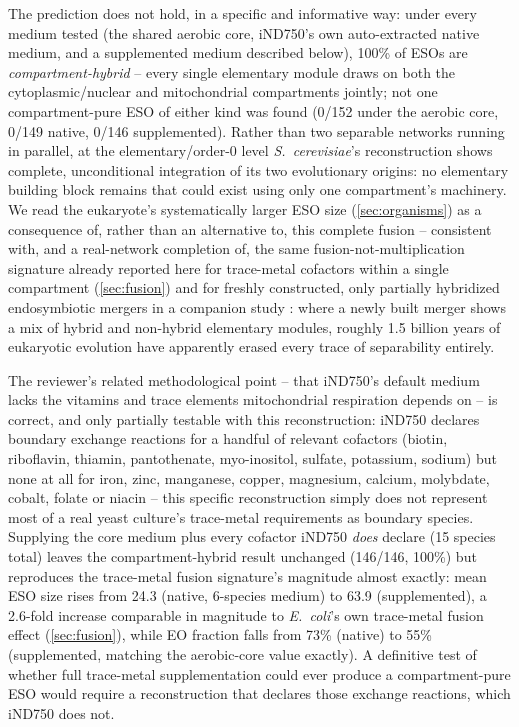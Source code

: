 \documentclass[nocrop]{bioinfo}
\begin{document}
The prediction does not hold, in a specific and informative way: under every medium tested (the shared aerobic core, iND750's own auto-extracted native medium, and a supplemented medium described below), 100\% of ESOs are \emph{compartment-hybrid} -- every single elementary module draws on both the cytoplasmic/nuclear and mitochondrial compartments jointly; not one compartment-pure ESO of either kind was found (0/152 under the aerobic core, 0/149 native, 0/146 supplemented). Rather than two separable networks running in parallel, at the elementary/order-0 level \textit{S.\ cerevisiae}'s reconstruction shows complete, unconditional integration of its two evolutionary origins: no elementary building block remains that could exist using only one compartment's machinery. We read the eukaryote's systematically larger ESO size (\cref{sec:organisms}) as a consequence of, rather than an alternative to, this complete fusion -- consistent with, and a real-network completion of, the same fusion-not-multiplication signature already reported here for trace-metal cofactors within a single compartment (\cref{sec:fusion}) and for freshly constructed, only partially hybridized endosymbiotic mergers in a companion study \citep{velozendosymbiosis2026}: where a newly built merger shows a mix of hybrid and non-hybrid elementary modules, roughly 1.5 billion years of eukaryotic evolution have apparently erased every trace of separability entirely.

The reviewer's related methodological point -- that iND750's default medium lacks the vitamins and trace elements mitochondrial respiration depends on -- is correct, and only partially testable with this reconstruction: iND750 declares boundary exchange reactions for a handful of relevant cofactors (biotin, riboflavin, thiamin, pantothenate, myo-inositol, sulfate, potassium, sodium) but none at all for iron, zinc, manganese, copper, magnesium, calcium, molybdate, cobalt, folate or niacin -- this specific reconstruction simply does not represent most of a real yeast culture's trace-metal requirements as boundary species. Supplying the core medium plus every cofactor iND750 \emph{does} declare (15 species total) leaves the compartment-hybrid result unchanged (146/146, 100\%) but reproduces the trace-metal fusion signature's magnitude almost exactly: mean ESO size rises from 24.3 (native, 6-species medium) to 63.9 (supplemented), a 2.6-fold increase comparable in magnitude to \textit{E.\ coli}'s own trace-metal fusion effect (\cref{sec:fusion}), while EO fraction falls from 73\% (native) to 55\% (supplemented, matching the aerobic-core value exactly). A definitive test of whether full trace-metal supplementation could ever produce a compartment-pure ESO would require a reconstruction that declares those exchange reactions, which iND750 does not.
\end{document}

